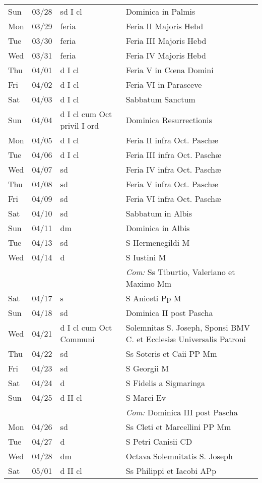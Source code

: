 \documentclass[10pt]{article}
\begin{document}
\begin{longtable}{ l l l l }
Sun & 03/28 & sd I cl & Dominica in Palmis\\
Mon & 03/29 & feria & Feria II Majoris Hebd\\
Tue & 03/30 & feria & Feria III Majoris Hebd\\
Wed & 03/31 & feria & Feria IV Majoris Hebd\\
Thu & 04/01 & d I cl & Feria V in Cœna Domini\\
Fri & 04/02 & d I cl & Feria VI in Parasceve\\
Sat & 04/03 & d I cl & Sabbatum Sanctum\\
Sun & 04/04 & d I cl cum Oct privil I ord & Dominica Resurrectionis\\
Mon & 04/05 & d I cl & Feria II infra Oct. Paschæ\\
Tue & 04/06 & d I cl & Feria III infra Oct. Paschæ\\
Wed & 04/07 & sd & Feria IV infra Oct. Paschæ\\
Thu & 04/08 & sd & Feria V infra Oct. Paschæ\\
Fri & 04/09 & sd & Feria VI infra Oct. Paschæ\\
Sat & 04/10 & sd & Sabbatum in Albis\\
Sun & 04/11 & dm & Dominica in Albis\\
Tue & 04/13 & sd & S Hermenegildi M\\
Wed & 04/14 & d & S Iustini M\\
 & & & \textit{Com:} Ss Tiburtio, Valeriano et Maximo Mm\\
Sat & 04/17 & s & S Aniceti Pp M\\
Sun & 04/18 & sd & Dominica II post Pascha\\
Wed & 04/21 & d I cl cum Oct Communi & Solemnitas S. Joseph, Sponsi BMV C. et Ecclesiæ Universalis Patroni\\
Thu & 04/22 & sd & Ss Soteris et Caii PP Mm\\
Fri & 04/23 & sd & S Georgii M\\
Sat & 04/24 & d & S Fidelis a Sigmaringa\\
Sun & 04/25 & d II cl & S Marci Ev\\
 & & & \textit{Com:} Dominica III post Pascha\\
Mon & 04/26 & sd & Ss Cleti et Marcellini PP Mm\\
Tue & 04/27 & d & S Petri Canisii CD\\
Wed & 04/28 & dm & Octava Solemnitatis S. Joseph\\
Sat & 05/01 & d II cl & Ss Philippi et Iacobi APp\\

\end{longtable}
\end{document}
